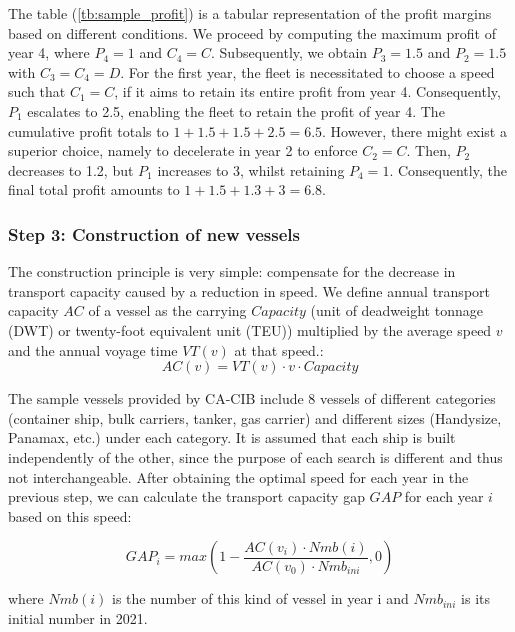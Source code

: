 \documentclass[a4paper,12pt]{article}
\begin{document}
The table (\ref{tb:sample_profit}) is a tabular representation of the profit margins based on different conditions.
We proceed by computing the maximum profit of year 4, where $P_4 = 1$ and $C_4 = C$. Subsequently, we obtain $P_3 = 1.5$ and $P_2 = 1.5$ with $C_3 = C_4 = D$. For the first year, the fleet is necessitated to choose a speed such that $C_1 = C$, if it aims to retain its entire profit from year 4. Consequently, $P_1$ escalates to 2.5, enabling the fleet to retain the profit of year 4. The cumulative profit totals to $1+1.5+1.5+2.5 = 6.5$. However, there might exist a superior choice, namely to decelerate in year 2 to enforce $C_2 = C$. Then, $P_2$ decreases to 1.2, but $P_1$ increases to 3, whilst retaining $P_4 = 1$. Consequently, the final total profit amounts to $1 + 1.5 + 1.3 + 3 = 6.8$.


\subsubsection{Step 3: Construction of new vessels}
The construction principle is very simple: compensate for the decrease in transport capacity caused by a reduction in speed.
We define annual transport capacity $AC$ of a vessel as the carrying $Capacity$ (unit of deadweight tonnage (DWT) or twenty-foot equivalent unit (TEU)) multiplied by the average speed $v$ and the annual voyage time $VT(v)$ at that speed.:
\begin{equation}
	\label{eq:AC}
	AC(v) = VT(v)  \cdot v \cdot Capacity
\end{equation}

The sample vessels provided by CA-CIB include 8 vessels of different categories (container ship, bulk carriers, tanker, gas carrier) and different sizes (Handysize, Panamax, etc.) under each category.
It is assumed that each ship is built independently of the other, since the purpose of each search is different and thus not interchangeable.
After obtaining the optimal speed for each year in the previous step, we can calculate the transport capacity gap $GAP$ for each year $i$ based on this speed:

\begin{equation}
	\label{eq:gap}
	GAP_{i} = max(1 - \frac{AC(v_i) \cdot Nmb(i)}{AC(v_0) \cdot Nmb_{ini}}, 0) 
\end{equation}

where $Nmb(i)$ is the number of this kind of vessel in year i and $Nmb_{ini}$ is its initial number in 2021.\\
\end{document}
